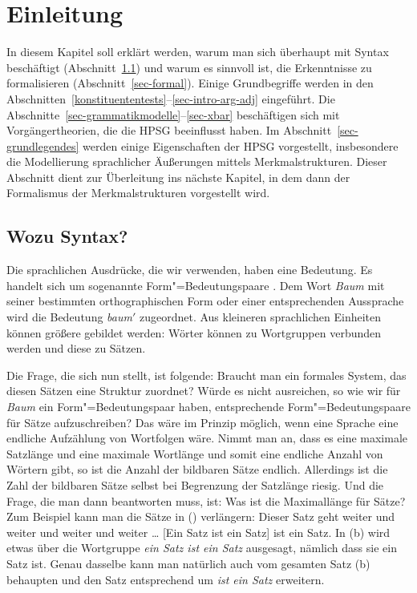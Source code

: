 

\chapter{Einleitung}

In diesem Kapitel soll erklärt werden, warum man sich überhaupt mit Syntax
beschäftigt (Abschnitt~\ref{sec-wozu-syntax}) und 
warum es sinnvoll ist, die Erkenntnisse zu formalisieren (Abschnitt~\ref{sec-formal}).
Einige Grundbegriffe werden in den Abschnitten~\ref{konstituententests}--\ref{sec-intro-arg-adj} eingeführt. 
Die Abschnitte~\ref{sec-grammatikmodelle}--\ref{sec-xbar}
beschäftigen sich mit Vorgängertheorien, die die HPSG beeinflusst haben.
Im Abschnitt~\ref{sec-grundlegendes} werden einige Eigenschaften der HPSG
vorgestellt, insbesondere die Modellierung sprachlicher Äußerungen mittels
Merkmalstrukturen. Dieser Abschnitt dient zur Überleitung ins nächste Kapitel,
in dem dann der Formalismus der Merkmalstrukturen vorgestellt wird.

\section{Wozu Syntax?}
\label{sec-wozu-syntax}

Die sprachlichen Ausdrücke, die wir verwenden, haben eine Bedeutung. Es handelt
sich um sogenannte Form"=Bedeutungspaare \citep{Saussure16a-de}. Dem Wort \emph{Baum}
mit seiner bestimmten orthographischen Form oder einer entsprechenden Aussprache
wird die Bedeutung \emph{baum}$'$ zugeordnet. Aus kleineren sprachlichen Einheiten
können größere gebildet werden: Wörter können zu Wortgruppen verbunden werden
und diese zu Sätzen.

Die Frage, die sich nun stellt, ist folgende: Braucht man ein formales System, das
diesen Sätzen eine Struktur zuordnet? Würde es nicht ausreichen, so wie wir
für \emph{Baum} ein Form"=Bedeutungspaar haben, entsprechende Form"=Bedeutungspaare
für Sätze aufzuschreiben?\label{Seite-Alle-Sätze-aufschreiben} Das wäre im Prinzip möglich, wenn eine Sprache eine
endliche Aufzählung von Wortfolgen wäre. Nimmt man an,
dass es eine maximale Satzlänge und eine maximale Wortlänge und somit eine endliche
Anzahl von Wörtern gibt, so ist die Anzahl der bildbaren Sätze endlich.
Allerdings ist die Zahl der bildbaren Sätze selbst bei Begrenzung der Satzlänge riesig.
Und die Frage, die man dann beantworten muss, ist: Was ist die Maximallänge für
Sätze? Zum Beispiel kann man die Sätze in () verlängern:
\eal
\ex Dieser Satz geht weiter und weiter und weiter und weiter \ldots
\ex {}[Ein Satz ist ein Satz] ist ein Satz.
\zl
In (b) wird etwas über die Wortgruppe \emph{ein Satz ist ein Satz} ausgesagt, nämlich dass sie
ein Satz ist. Genau dasselbe kann man natürlich auch vom gesamten Satz (b) behaupten und den Satz
entsprechend um \emph{ist ein Satz} erweitern.

